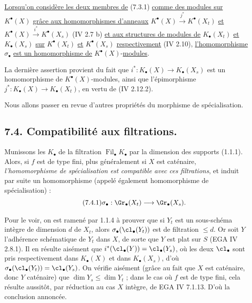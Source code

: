 
\noindent \uline{Lorsqu'on considère les deux membres de} (7.3.1) \uline{comme des modules sur} \(K^{\bullet}(X)\) \uline{grâce aux homomorphismes d'anneaux} \(K^{\bullet}(X)\xrightarrow{j^*}K^{\bullet}(X_t)\) \uline{et} \(K^{\bullet}(X)\xrightarrow{i^*}K^{\bullet}(X_s)\) (IV 2.7 b) \uline{et aux structures de modules de} \(K_\bullet(X_t)\) \uline{et} \(K_\bullet(X_s)\) \uline{sur} \(K^{\bullet}(X_t)\) \uline{et} \(K^{\bullet}(X_s)\) \uline{respectivement} (IV 2.10), \uline{l'homomorphisme} \(\sigma_\bullet\) \uline{est un homomorphisme de} \(K^{\bullet}(X)\)-\uline{modules}.

La dernière assertion provient du fait que \(i^*:K_\bullet(X)\to K_\bullet(X_s)\) est un homomorphisme de \(K^{\bullet}(X)\)-modules, ainsi que l'épimorphisme \(j^*:K_\bullet(X)\longrightarrow K_\bullet(X_t)\), en vertu de (IV 2.12.2).

Nous allons passer en revue d'autres propriétés du morphisme de spécialisation.

\subsection*{7.4. Compatibilité aux filtrations.}
Munissons les \(K_\bullet\) de la filtration \(\operatorname{Fil}_\bullet K_\bullet\) par la dimension des supports (1.1.1). Alors, si \(f\) est de type fini, plus généralement si \(X\) est caténaire, \emph{l'homomorphisme de spécialisation est compatible avec ces filtrations}, et induit par suite un homomorphisme (appelé également homomorphisme de spécialisation) :
\begin{equation}\tag{7.4.1}
  \sigma_\bullet:\Gr_\bullet(X_t)\longrightarrow \Gr_\bullet(X_s).
\end{equation}

Pour le voir, on est ramené par 1.1.4 à prouver que si \(Y_t\) est un sous-schéma intègre de dimension \(d\) de \(X_t\), alors \(\sigma_\bullet(\cl_\bullet(Y_t))\) est de filtration \(\leq d\). Or soit \(Y\) l'adhérence schématique de \(Y_t\) dans \(X\), de sorte que \(Y\) est plat sur \(S\) (EGA IV 2.8.1). Il en résulte aisément que \(i^*(\cl_\bullet(Y))=\cl_\bullet(Y_s)\), où les deux \(\cl_\bullet\) sont pris respectivement dans \(K_\bullet(X)\) et dans \(K_\bullet(X_s)\), d'où \(\sigma_\bullet(\cl_\bullet(Y_t))=\cl_\bullet(Y_s)\). On vérifie aisément (grâce au fait que \(X\) est caténaire, donc \(Y\) caténaire) que \(\dim Y_s\leq \dim Y_t\) ; dans le cas où \(f\) est de type fini, cela résulte aussitôt, par réduction au cas \(X\) intègre, de EGA IV 7.1.13. D'où la conclusion annoncée.

